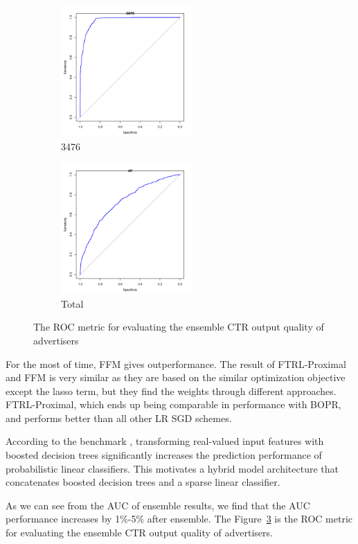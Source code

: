 \begin{figure}[htbp]

\begin{subfigure}{0.5\textwidth}
\includegraphics[width=0.9\linewidth, height=5cm]{3476.pdf}
\caption{3476}
\label{fig:3476}
\end{subfigure}
\begin{subfigure}{0.5\textwidth}
\includegraphics[width=0.9\linewidth, height=5cm]{all.pdf}
\caption{Total}
\label{fig:all}
\end{subfigure}

\caption{The ROC metric for evaluating the ensemble CTR output quality of advertisers}
\label{fig:image2}
\end{figure}

For the most of time, FFM gives outperformance. The result of FTRL-Proximal and FFM is very similar as they are based on the similar optimization objective except the lasso term, but they find the weights through different approaches. FTRL-Proximal, which ends up being comparable in performance with BOPR, and performs better than all other LR SGD schemes.

According to the benchmark \cite{zhang2014real}, transforming real-valued input features with boosted decision trees significantly increases the prediction performance of probabilistic linear classifiers. This motivates a hybrid model architecture that concatenates boosted decision trees and a sparse linear classifier.

As we can see from the AUC of ensemble results, we find that the AUC performance increases by 1$\%$-5$\%$ after ensemble. The Figure~\ref{fig:image2} is the ROC metric for evaluating the ensemble CTR output quality of advertisers.

